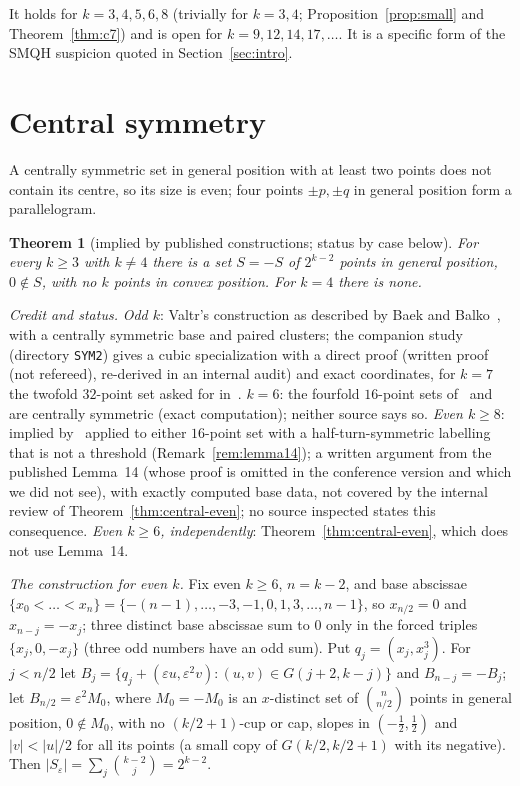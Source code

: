 \documentclass[10pt]{article}
\newtheorem{theorem}{Theorem}[section]
\theoremstyle{definition}
\theoremstyle{remark}
\newcommand{\dirn}[1]{{\upshape\nolinkurl{#1}}}
\begin{document}
It holds for $k=3,4,5,6,8$ (trivially for $k=3,4$; Proposition~\ref{prop:small} and Theorem~\ref{thm:c7}) and is open
for $k=9,12,14,17,\dots$. It is a specific form of the SMQH suspicion quoted in Section~\ref{sec:intro}.

\section{Central symmetry}\label{sec:central}

A centrally symmetric set in general position with at least two points does not contain its centre, so its size is
even; four points $\pm p,\pm q$ in general position form a parallelogram.

\begin{theorem}[implied by published constructions; status by case below]\label{thm:central}
For every $k\ge3$ with $k\ne4$ there is a set $S=-S$ of $2^{k-2}$ points in general position, $0\notin S$, with no $k$
points in convex position. For $k=4$ there is none.
\end{theorem}

\noindent\emph{Credit and status.}
\emph{Odd $k$}: Valtr's construction as described by Baek and Balko~\cite[Def.~13, Lemma~14, \S6.1]{BB25}, with a
centrally symmetric base and paired clusters; the companion study (directory \dirn{SYM2}) gives a cubic specialization
with a direct proof (written proof (not refereed), re-derived in an internal audit) and exact coordinates, for $k=7$ the
twofold $32$-point set asked for in~\cite[\S7]{SMQH25}. \emph{$k=6$}: the fourfold $16$-point sets
of~\cite[App.~C, Table~1]{SMQH25} and~\cite[Fig.~3.28]{Mac25} are centrally symmetric (exact computation); neither source
says so. \emph{Even $k\ge8$}: implied by~\cite[Lemma~14]{BB25} applied to either $16$-point set with a half-turn-symmetric
labelling that is not a threshold (Remark~\ref{rem:lemma14}); a written argument from the published Lemma~14 (whose
proof is omitted in the conference version and which we did not see), with exactly computed base data, not covered by
the internal review of Theorem~\ref{thm:central-even}; no source inspected states this consequence.
\emph{Even $k\ge6$, independently}: Theorem~\ref{thm:central-even}, which does not use Lemma~14.

\medskip\noindent\emph{The construction for even $k$.} Fix even $k\ge6$, $n=k-2$, and base abscissae
$\{x_0<\dots<x_n\}=\{-(n-1),\dots,-3,-1,0,1,3,\dots,n-1\}$, so $x_{n/2}=0$ and $x_{n-j}=-x_j$; three distinct base
abscissae sum to $0$ only in the forced triples $\{x_j,0,-x_j\}$ (three odd numbers have an odd sum). Put
$q_j=(x_j,x_j^3)$. For $j<n/2$ let $B_j=\{q_j+(\varepsilon u,\varepsilon^2v):(u,v)\in G(j+2,k-j)\}$ and
$B_{n-j}=-B_j$; let $B_{n/2}=\varepsilon^2M_0$, where $M_0=-M_0$ is an $x$-distinct set of $\binom{n}{n/2}$ points in
general position, $0\notin M_0$, with no $(k/2+1)$-cup or cap, slopes in $(-\frac12,\frac12)$ and $|v|<|u|/2$ for all
its points (a small copy of $G(k/2,k/2+1)$ with its negative). Then $|S_\varepsilon|=\sum_j\binom{k-2}{j}=2^{k-2}$.
\end{document}
